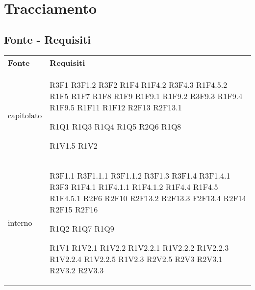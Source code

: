 \section{Tracciamento}
	\subsection{Fonte - Requisiti}
	\begin{longtable} {
		>{\centering}p{28mm}  
		>{}p{20mm}
		}
	\rowcolor{gray!50}
		\textbf{Fonte} & \textbf{Requisiti}	\TBstrut \\
				
		capitolato & 
		R3F1
		R3F1.2
		R3F2
		R1F4
		R1F4.2
		R3F4.3
		R1F4.5.2
		R1F5
		R1F7
		R1F8
		R1F9
		R1F9.1
		R1F9.2
		R3F9.3
		R1F9.4
		R1F9.5
		R1F11
		R1F12
		R2F13
		R2F13.1
				
		R1Q1 
		R1Q3 
		R1Q4 
		R1Q5 
		R2Q6
		R1Q8
		 
		R1V1.5
		R1V2 \TBstrut \\ [2mm]
				
		interno & 
		R3F1.1
		R3F1.1.1
		R3F1.1.2
		R3F1.3
		R3F1.4
		R3F1.4.1
		R3F3
		R1F4.1
		R1F4.1.1
		R1F4.1.2
		R1F4.4
		R1F4.5
		R1F4.5.1
		R2F6
		R2F10
		R2F13.2
		R2F13.3
		F2F13.4
		R2F14
		R2F15
		R2F16
		
		R1Q2 
		R1Q7
		R1Q9 
		
		R1V1 
		R1V2.1 
		R1V2.2 
		R1V2.2.1 
		R1V2.2.2 
		R1V2.2.3 
		R1V2.2.4 
		R1V2.2.5 
		R1V2.3 
		R2V2.5 
		R2V3 
		R2V3.1 
		R2V3.2 
		R2V3.3 \TBstrut \\ [2mm]
				

\end{longtable}
